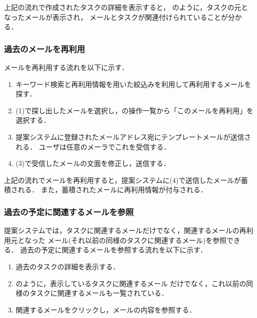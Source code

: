 \documentclass[submit,techreq,noauthor,dvipdfmx]{ipsj}
\begin{document}
上記の流れで作成されたタスクの詳細を表示すると，
のように，タスクの元となったメールが表示され，
メールとタスクが関連付けられていることが分かる．

\subsubsection{過去のメールを再利用}\label{sec:use_example2}


メールを再利用する流れを以下に示す．

\begin{enumerate}
\item キーワード検索と再利用情報を用いた絞込みを利用して再利用するメールを探す．
\item (1)で探し出したメールを選択し，の操作一覧から「このメールを再利用」を選択する．
\item 提案システムに登録されたメールアドレス宛にテンプレートメールが送信される．
  ユーザは任意のメーラでこれを受信する．
\item (3)で受信したメールの文面を修正し，送信する．
\end{enumerate}

上記の流れでメールを再利用すると，提案システムに(4)で送信したメールが蓄積される．
また，蓄積されたメールに再利用情報が付与される．

\subsubsection{過去の予定に関連するメールを参照}\label{sec:use_example3}


提案システムでは，タスクに関連するメールだけでなく，関連するメールの再利用元となった
メール(それ以前の同様のタスクに関連するメール)を参照できる．
過去の予定に関連するメールを参照する流れを以下に示す．

\begin{enumerate}
\item 過去のタスクの詳細を表示する．
\item {}のように，表示しているタスクに関連するメール
  だけでなく，これ以前の同様のタスクに関連するメールも一覧されている．
\item 関連するメールをクリックし，メールの内容を参照する．
\end{enumerate}
\end{document}
